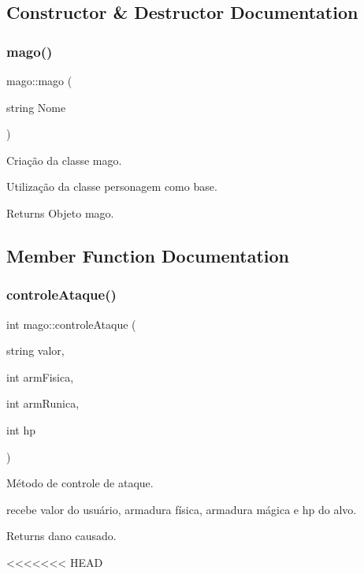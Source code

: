 \subsection{Constructor \& Destructor Documentation}
\mbox{\label{classmago_ae5292ae10f4e5cae0a4a73d185807fbc}} 
\subsubsection{\texorpdfstring{mago()}{mago()}}
{\footnotesize\ttfamily mago\+::mago (\begin{DoxyParamCaption}\item[{string}]{Nome }\end{DoxyParamCaption})}



Criação da classe mago. 

Utilização da classe personagem como base. \begin{DoxyReturn}{Returns}
Objeto mago. 
\end{DoxyReturn}


\subsection{Member Function Documentation}
\mbox{\label{classmago_af10f6c9bcbbf77870f376a48b1cd0601}} 
\subsubsection{\texorpdfstring{controle\+Ataque()}{controleAtaque()}}
{\footnotesize\ttfamily int mago\+::controle\+Ataque (\begin{DoxyParamCaption}\item[{string}]{valor,  }\item[{int}]{arm\+Fisica,  }\item[{int}]{arm\+Runica,  }\item[{int}]{hp }\end{DoxyParamCaption})}



Método de controle de ataque. 

recebe valor do usuário, armadura física, armadura mágica e hp do alvo. \begin{DoxyReturn}{Returns}
dano causado. 
\end{DoxyReturn}
<<<<<<< HEAD
\mbox{\label{classmago_a8953a4898dea53c2c4a63542f49a7d86}} 

